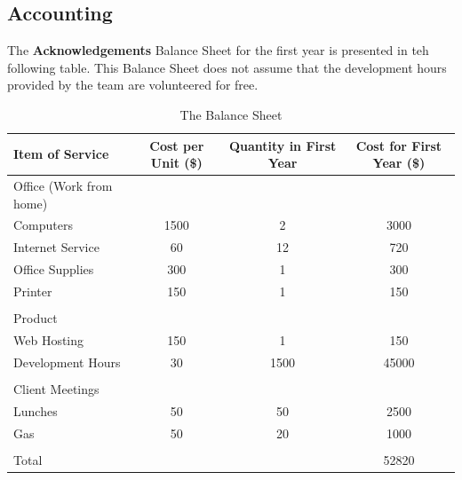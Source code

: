 \subsection{Accounting}
The {\bf Acknowledgements} Balance Sheet for the first year is presented in teh following table. This Balance Sheet does not assume that the development hours provided by the team are volunteered for free.

\begin{table}[ht]
\caption{The Balance Sheet} %
\centering %
\begin{tabular}{| l c c c |} %
\hline
Item of Service & Cost per Unit (\$) & Quantity in First Year & Cost for First Year (\$) \\
\hline %
Office (Work from home) & & & \\
Computers & 1500 & 2 & 3000 \\
Internet Service & 60 & 12 & 720 \\
Office Supplies & 300 & 1 & 300 \\
Printer & 150 & 1 & 150 \\
 &   &   &   \\
Product &   &   &   \\
Web Hosting & 150 & 1 & 150 \\
Development Hours & 30 & 1500 & 45000 \\
  &   &   &   \\
Client Meetings &   &   &   \\
Lunches & 50 &  50 & 2500\\
Gas & 50 & 20 & 1000 \\
 &   &  &   \\
Total &   &   & 52820 \\

\hline %
\end{tabular}
\label{balanceSheet} %
\end{table}

